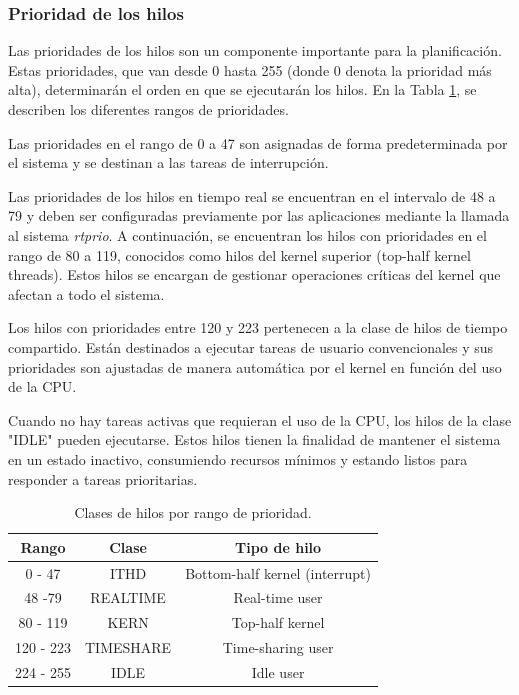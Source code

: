 \subsubsection{Prioridad de los hilos}

Las prioridades de los hilos son un componente importante para la planificación. Estas prioridades, que van desde 0 hasta 255 (donde 0 denota la prioridad más alta), determinarán el orden en que se ejecutarán los hilos. En la Tabla \ref{tabla:prio_hilos}, se describen los diferentes rangos de prioridades.

Las prioridades en el rango de 0 a 47 son asignadas de forma predeterminada por el sistema y se destinan a las tareas de interrupción.\par

Las prioridades de los hilos en tiempo real se encuentran en el intervalo de 48 a 79 y deben ser configuradas previamente por las aplicaciones mediante la llamada al sistema \textit{rtprio}. A continuación, se encuentran los hilos con prioridades en el rango de 80 a 119, conocidos como hilos del kernel superior (top-half kernel threads). Estos hilos se encargan de gestionar operaciones críticas del kernel que afectan a todo el sistema.\par

Los hilos con prioridades entre 120 y 223 pertenecen a la clase de hilos de tiempo compartido. Están destinados a ejecutar tareas de usuario convencionales y sus prioridades son ajustadas de manera automática por el kernel en función del uso de la CPU.\par

Cuando no hay tareas activas que requieran el uso de la CPU, los hilos de la clase "IDLE" pueden ejecutarse. Estos hilos tienen la finalidad de mantener el sistema en un estado inactivo, consumiendo recursos mínimos y estando listos para responder a tareas prioritarias.\par

\begin{table}[H]
    \centering
    \begin{tabular}{|c|c|c|}
        \hline
        \textbf{Rango} & \textbf{Clase} & \textbf{Tipo de hilo} \\
        \hline
        0 - 47 & ITHD & Bottom-half kernel (interrupt) \\
        \hline
        48 -79 & REALTIME & Real-time user \\
        \hline
        80 - 119 & KERN & Top-half kernel \\
        \hline
        120 - 223 & TIMESHARE & Time-sharing user \\
        \hline
        224 - 255 & IDLE & Idle user \\
        \hline
    \end{tabular}
    \caption{Clases de hilos por rango de prioridad.}
    \label{tabla:prio_hilos}
\end{table}


